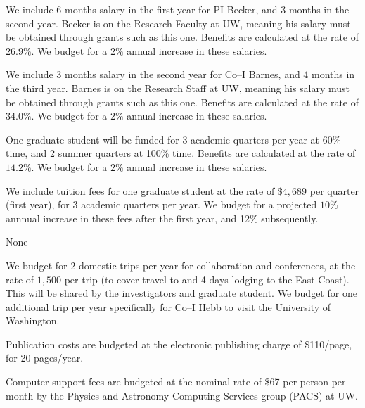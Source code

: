 \bigskip {} 

We include 6 months salary in the first year for PI Becker, and 3
months in the second year. Becker is on the Research Faculty at UW,
meaning his salary must be obtained through grants such as this one.
Benefits are calculated at the rate of $26.9\%$.  We budget for a
$2\%$ annual increase in these salaries.

We include 3 months salary in the second year for Co--I Barnes, and 4
months in the third year.  Barnes is on the Research Staff at UW,
meaning his salary must be obtained through grants such as this one.
Benefits are calculated at the rate of $34.0\%$.  We budget for a
$2\%$ annual increase in these salaries.

\bigskip {} 

One graduate student will be funded for 3 academic quarters per year
at 60\% time, and 2 summer quarters at 100\% time.  Benefits are
calculated at the rate of $14.2\%$.  We budget for a $2\%$ annual
increase in these salaries.

\bigskip {} 

We include tuition fees for one graduate student at the rate of
$\$4,689$ per quarter (first year), for 3 academic quarters per year.
We budget for a projected $10\%$ annnual increase in these fees after
the first year, and 12\% subsequently.

\bigskip {} 

None

\bigskip {} 

We budget for 2 domestic trips per year for collaboration and
conferences, at the rate of $1,500$ per trip (to cover travel to and 4
days lodging to the East Coast).  This will be shared by the
investigators and graduate student.  We budget for one additional trip
per year specifically for Co--I Hebb to visit the University of
Washington.

\bigskip {} 

Publication costs are budgeted at the electronic publishing charge
of \$110/page, for 20 pages/year.

\bigskip {} 

Computer support fees are budgeted at the nominal rate of \$67 per
person per month by the Physics and Astronomy Computing Services group
(PACS) at UW.  

\bigskip {} 

